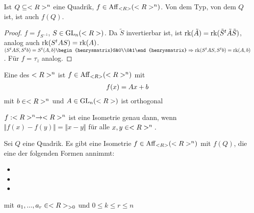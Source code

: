 \begin{lemma}
	Ist $Q\subseteq<R>^n$ eine Quadrik, $f\in\operatorname{Aff}_{<R>}(<R>^n)$. Von dem Typ, von dem $Q$ ist, ist auch $f(Q)$.
\end{lemma}
\begin{proof}
	$f=f_{S^{-1}}$, $S\in\operatorname{GL}_n(<R>)$. Da $\tilde{S}$ invertierbar ist, ist $\operatorname{rk}(\tilde{A})= \operatorname{rk}(\tilde{S}^t\tilde{A}\tilde{S})$, analog auch $\operatorname{rk}(S^tAS)=\operatorname{rk}(A)$. \\
	$(S^tAS,S^tb)=S^t(A,b)\begin{henrysmatrix}S&0\\0&1\end{henrysmatrix}\Rightarrow \rk(S^tAS,S^tb)=\rk(A,b)$. Für $f=\tau_z$ analog.
\end{proof}

\begin{definition}[Isometrie]
	Eine  des $<R>^n$ ist $f\in\operatorname{Aff}_{<R>}(<R>^n)$ mit
	\begin{align}
		f(x)=Ax+b\notag
	\end{align}
	mit $b\in<R>^n$ und $A\in\operatorname{GL}_n(<R>)$ ist orthogonal
\end{definition}

\begin{remark}
	$f:<R>^n\to<R>^n$ ist eine Isometrie genau dann, wenn $\Vert f(x)-f(y)\Vert=\Vert x-y\Vert$ für alle $x,y\in<R>^n.$
\end{remark}

\begin{theorem}
	Sei $Q$ eine Quadrik. Es gibt eine Isometrie $f\in\operatorname{Aff}_{<R>}(<R>^n)$ mit $f(Q)$, die eine der folgenden Formen annimmt:
	\begin{itemize}
		\item {}
		\item {}
		\item {}
	\end{itemize}
	mit $a_1,...,a_r\in<R>_{>0}$ und $0\le k\le r\le n$
\end{theorem}